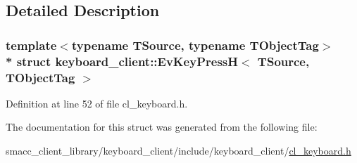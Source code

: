 \subsection{Detailed Description}
\subsubsection*{template$<$typename T\+Source, typename T\+Object\+Tag$>$\\*
struct keyboard\+\_\+client\+::\+Ev\+Key\+Press\+H$<$ T\+Source, T\+Object\+Tag $>$}



Definition at line 52 of file cl\+\_\+keyboard.\+h.



The documentation for this struct was generated from the following file\+:\begin{DoxyCompactItemize}
\item 
smacc\+\_\+client\+\_\+library/keyboard\+\_\+client/include/keyboard\+\_\+client/\hyperlink{cl__keyboard_8h}{cl\+\_\+keyboard.\+h}\end{DoxyCompactItemize}
